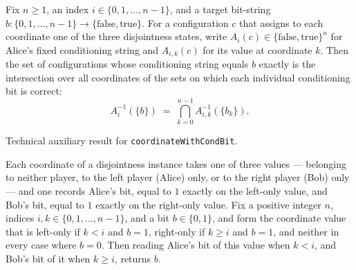 \begin{theorem}
\label{CommunicationComplexity.Functions.Disjointness.RandomizedLowerBound.coordinateAliceCondBits_fiber_eq_iInter}
\leanok
{}
Fix $n \ge 1$, an index $i \in \{0, 1, \dots, n-1\}$, and a target bit-string $b \colon
\{0,1,\dots,n-1\} \to \{\mathrm{false},\mathrm{true}\}$. For a configuration $c$ that
assigns to each coordinate one of the three disjointness states, write $A_i(c) \in
\{\mathrm{false},\mathrm{true}\}^n$ for Alice's fixed conditioning string and
$A_{i,k}(c)$ for its value at coordinate $k$. Then the set of configurations whose
conditioning string equals $b$ exactly is the intersection over all coordinates of the
sets on which each individual conditioning bit is correct:
\[
A_i^{-1}(\{b\}) \;=\; \bigcap_{k=0}^{n-1} A_{i,k}^{-1}(\{b_k\}).
\]
\end{theorem}

\begin{definition}[Coordinatewithcondbit]
\label{CommunicationComplexity.Functions.Disjointness.RandomizedLowerBound.coordinateWithCondBit}
\leanok
Technical auxiliary result for \texttt{coordinateWithCondBit}.
\end{definition}

\begin{theorem}
\label{CommunicationComplexity.Functions.Disjointness.RandomizedLowerBound.coordinateWithCondBit_spec}
\leanok
{}
Each coordinate of a disjointness instance takes one of three values — belonging to
neither player, to the left player (Alice) only, or to the right player (Bob) only — and
one records Alice's bit, equal to $1$ exactly on the left-only value, and Bob's bit,
equal to $1$ exactly on the right-only value. Fix a positive integer $n$, indices $i, k
\in \{0, 1, \dots, n-1\}$, and a bit $b \in \{0,1\}$, and form the coordinate value that
is left-only if $k < i$ and $b = 1$, right-only if $k \ge i$ and $b = 1$, and neither in
every case where $b = 0$. Then reading Alice's bit of this value when $k < i$, and Bob's
bit of it when $k \ge i$, returns $b$.
\end{theorem}

